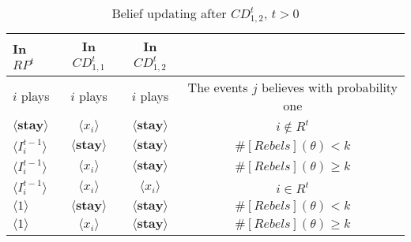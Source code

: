 \documentclass[12pt,letterpaper]{article}
\newtheorem*{main result}{Main Result}
\theoremstyle{definition}
\theoremstyle{remark}
\theoremstyle{claim}
\begin{document}
\begin{table}[ht]
\caption{Belief updating after $CD^t_{1,2}$, $t>0$}
\label{Table_blf_up_cdt12}
\begin{center}
\begin{tabular}{l c c c}
In $RP^t$ 	 	&  	In $CD^t_{1,1}$		&  In $CD^t_{1,2}$	  &\\
\hline
\hline
$i$ plays 		                             &  	$i$ plays		&				$i$ plays			& The events $j$ believes with probability one  \\
\hline
$\langle  \textbf{stay} \rangle$ 	& 	$\langle x_i \rangle$	&  $\langle \textbf{stay} \rangle$ &  $i\notin R^t$ \\
$\langle  {I^{t-1}_i} \rangle$ 		&  $\langle \textbf{stay} \rangle$	&	$\langle \textbf{stay} \rangle$ &  $\#[Rebels](\theta)< k$   \\
$\langle  {I^{t-1}_i} \rangle$ 		&  $\langle x_i \rangle$	&	$\langle \textbf{stay} \rangle$ &  $\#[Rebels](\theta)\geq k$    \\
$\langle  {I^{t-1}_i} \rangle$ 		&  $\langle x_i \rangle$	&	$\langle x_i \rangle$ &  $i\in R^t$  \\
$\langle 1 \rangle$ 		             &  $\langle \textbf{stay} \rangle$	&	$\langle \textbf{stay} \rangle$ &  $\#[Rebels](\theta)< k$\\
$\langle 1 \rangle$ 		             &  $\langle x_i \rangle$	&	$\langle \textbf{stay} \rangle$ & $\#[Rebels](\theta)\geq k$
\end{tabular}
\end{center}
\end{table}
\end{document}
